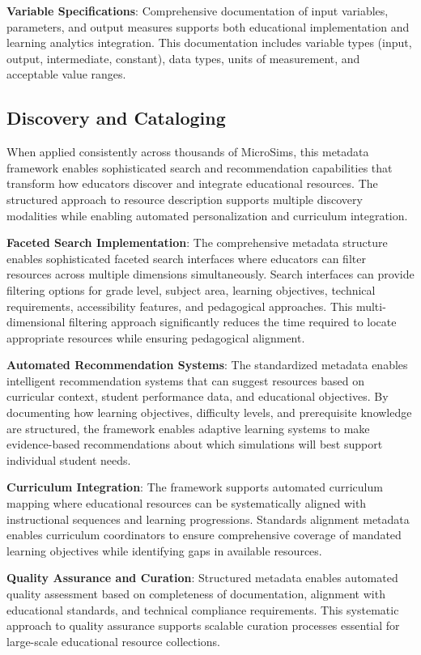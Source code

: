 \textbf{Variable Specifications}: Comprehensive documentation of input variables, parameters, and output measures supports both educational implementation and learning analytics integration. This documentation includes variable types (input, output, intermediate, constant), data types, units of measurement, and acceptable value ranges.

\subsection{Discovery and Cataloging}

When applied consistently across thousands of MicroSims, this metadata framework enables sophisticated search and recommendation capabilities that transform how educators discover and integrate educational resources. The structured approach to resource description supports multiple discovery modalities while enabling automated personalization and curriculum integration.

\textbf{Faceted Search Implementation}: The comprehensive metadata structure enables sophisticated faceted search interfaces where educators can filter resources across multiple dimensions simultaneously. Search interfaces can provide filtering options for grade level, subject area, learning objectives, technical requirements, accessibility features, and pedagogical approaches. This multi-dimensional filtering approach significantly reduces the time required to locate appropriate resources while ensuring pedagogical alignment.

\textbf{Automated Recommendation Systems}: The standardized metadata enables intelligent recommendation systems that can suggest resources based on curricular context, student performance data, and educational objectives. By documenting how learning objectives, difficulty levels, and prerequisite knowledge are structured, the framework enables adaptive learning systems to make evidence-based recommendations about which simulations will best support individual student needs.

\textbf{Curriculum Integration}: The framework supports automated curriculum mapping where educational resources can be systematically aligned with instructional sequences and learning progressions. Standards alignment metadata enables curriculum coordinators to ensure comprehensive coverage of mandated learning objectives while identifying gaps in available resources.

\textbf{Quality Assurance and Curation}: Structured metadata enables automated quality assessment based on completeness of documentation, alignment with educational standards, and technical compliance requirements. This systematic approach to quality assurance supports scalable curation processes essential for large-scale educational resource collections.

